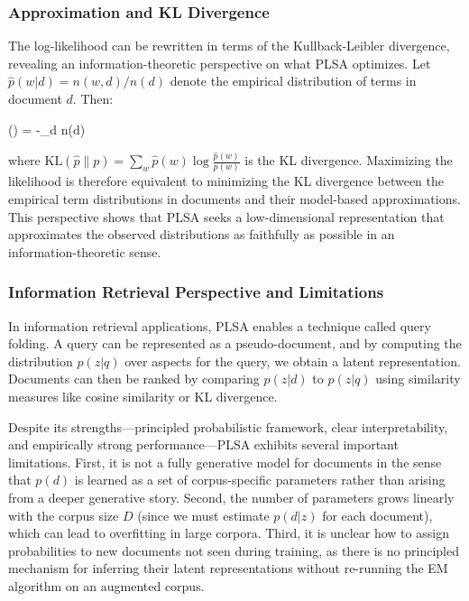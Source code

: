 \subsubsection*{Approximation and KL Divergence}

The log-likelihood can be rewritten in terms of the Kullback-Leibler divergence, revealing an information-theoretic perspective on what PLSA optimizes. Let $\hat{p}(w | d) = n(w,d) / n(d)$ denote the empirical distribution of terms in document $d$. Then:
\begin{myequation}
\ell() = -\sum_{d \in {}} n(d) 
\end{myequation}

where $\text{KL}(\hat{p} \| p) = \sum_w \hat{p}(w) \log \frac{\hat{p}(w)}{p(w)}$ is the KL divergence. Maximizing the likelihood is therefore equivalent to minimizing the KL divergence between the empirical term distributions in documents and their model-based approximations. This perspective shows that PLSA seeks a low-dimensional representation that approximates the observed distributions as faithfully as possible in an information-theoretic sense.

\subsubsection*{Information Retrieval Perspective and Limitations}

In information retrieval applications, PLSA enables a technique called query folding. A query can be represented as a pseudo-document, and by computing the distribution $p(z | q)$ over aspects for the query, we obtain a latent representation. Documents can then be ranked by comparing $p(z | d)$ to $p(z | q)$ using similarity measures like cosine similarity or KL divergence.

Despite its strengths—principled probabilistic framework, clear interpretability, and empirically strong performance—PLSA exhibits several important limitations. First, it is not a fully generative model for documents in the sense that $p(d)$ is learned as a set of corpus-specific parameters rather than arising from a deeper generative story. Second, the number of parameters grows linearly with the corpus size $D$ (since we must estimate $p(d | z)$ for each document), which can lead to overfitting in large corpora. Third, it is unclear how to assign probabilities to new documents not seen during training, as there is no principled mechanism for inferring their latent representations without re-running the EM algorithm on an augmented corpus.

